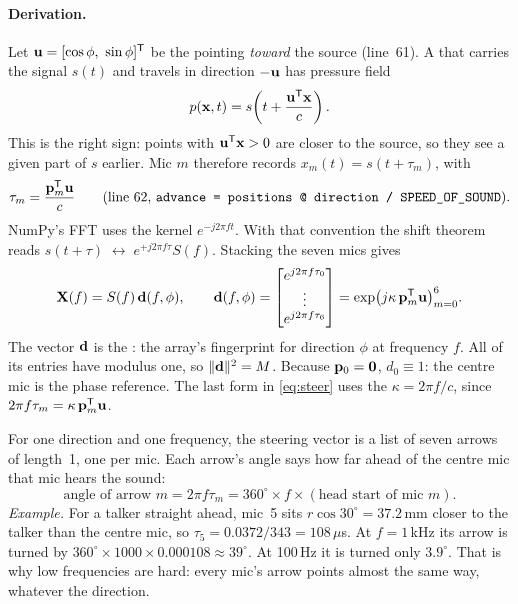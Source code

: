 \documentclass[11pt]{article}
\begin{document}
\paragraph{Derivation.}
Let $\mathbf{u}=[\cos\phi,\ \sin\phi]^{\mathsf T}$ be the  pointing \emph{toward}
the source (line~61). A  that carries the signal $s(t)$ and travels in direction $-\mathbf{u}$ has
pressure field
\begin{equation}
  p(\mathbf x,t)=s\!\left(t+\frac{\mathbf{u}^{\mathsf T}\mathbf x}{c}\right).
\end{equation}
This is the right sign: points with $\mathbf{u}^{\mathsf T}\mathbf x>0$ are closer to the source, so they see
a given part of $s$ earlier. Mic $m$ therefore records $x_m(t)=s(t+\tau_m)$, with
\begin{equation}\label{eq:tau}
  \tau_m=\frac{\vp_m\tr\vu}{c}\qquad\text{(line 62, \code{advance = positions @ direction / SPEED_OF_SOUND})}.
\end{equation}
NumPy's FFT uses the kernel $e^{-j2\pi ft}$. With that convention the shift theorem reads
$s(t+\tau)\;\longleftrightarrow\;e^{+j2\pi f\tau}S(f)$. Stacking the seven mics gives
\begin{equation}\label{eq:steer}
  \mathbf{X}(f)=S(f)\,\mathbf{d}(f,\phi),\qquad
  \mathbf{d}(f,\phi)=\begin{bmatrix}e^{j2\pi f\tau_0}\\ \vdots\\ e^{j2\pi f\tau_6}\end{bmatrix}
  =\exp\!\big(j\kappa\,\mathbf{p}_m^{\mathsf T}\mathbf{u}\big)_{m=0}^{6}.
\end{equation}
The vector $\mathbf{d}$ is the : the array's fingerprint for direction
$\phi$ at frequency $f$. All of its entries have modulus one, so $\|\mathbf{d}\|^2=M$. Because
$\mathbf{p}_0=\mathbf 0$, $d_0\equiv1$: the centre mic is the phase reference. The last form in
\eqref{eq:steer} uses the  $\kappa=2\pi f/c$, since
$2\pi f\tau_m=\kappa\,\mathbf{p}_m^{\mathsf T}\mathbf{u}$.

\begin{inplainwords}
For one direction and one frequency, the steering vector is a list of seven arrows of length~1,
one per mic. Each arrow's angle says how far ahead of the centre mic that mic hears the sound:
\[
  \text{angle of arrow }m=2\pi f\tau_m=360^\circ\times f\times(\text{head start of mic }m).
\]
\emph{Example.} For a talker straight ahead, mic~5 sits $r\cos30^\circ=37.2$\,mm closer to the
talker than the centre mic, so $\tau_5=0.0372/343=108\,\mu$s. At $f=1$\,kHz its arrow is turned
by $360^\circ\times1000\times0.000108\approx39^\circ$. At 100\,Hz it is turned only $3.9^\circ$.
That is why low frequencies are hard: every mic's arrow points almost the same way, whatever the
direction.
\end{inplainwords}
\end{document}
